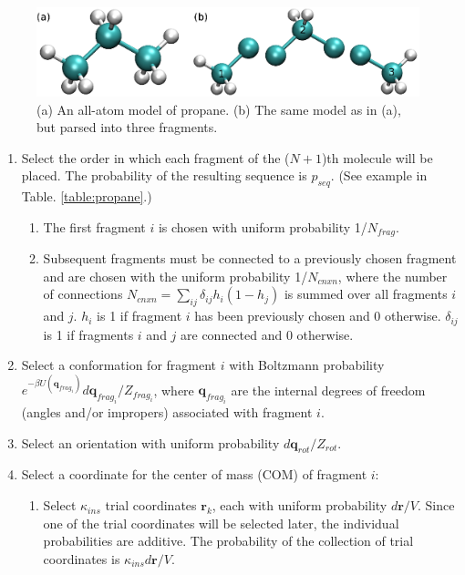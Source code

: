 \begin{figure}[h]
	\centering
	\includegraphics[width=0.99\textwidth]{c3}
	\caption{(a) An all-atom model of propane. (b) The same model as in (a), but parsed into three fragments.}
	\label{fig:propaneFragments}
\end{figure}


\begin{enumerate}
  \item Select the order in which each fragment of the ($N+1$)th molecule will be placed. The probability of the resulting sequence is $p_{seq}$. (See example in Table. \ref{table:propane}.)
  \begin{enumerate}
		\item The first fragment $i$ is chosen with uniform probability 1/$N_{frag}$.
    \item Subsequent fragments must be connected to a previously chosen fragment and are chosen with the uniform probability 1/$N_{cnxn}$, where the number of connections $N_{cnxn}= \sum_{ij}{\delta_{ij} h_{i} (1-h_{j})}$ is summed over all fragments $i$ and $j$. $h_i$ is 1 if fragment $i$ has been previously chosen and 0 otherwise. $\delta_{ij}$ is 1 if fragments $i$ and $j$ are connected and 0 otherwise.
  \end{enumerate}
	\item Select a conformation for fragment $i$ with Boltzmann probability \newline $e^{-\beta U(\mathbf{q}_{frag_i})}d\mathbf{q}_{frag_i}/Z_{frag_i}$, where $\mathbf{q}_{frag_i}$ are the internal degrees of freedom (angles and/or impropers) associated with fragment $i$.
	\item Select an orientation with uniform probability $d\mathbf{q}_{rot}/Z_{rot}$. 
	\item Select a coordinate for the center of mass (COM) of fragment $i$:
	\begin{enumerate}
		\item Select $\kappa_{ins}$ trial coordinates $\mathbf{r}_k$, each with uniform probability $d\mathbf{r}/V$. Since one of the trial coordinates will be selected later, the individual probabilities are additive. The probability of the collection of trial coordinates is $\kappa_{ins}d\mathbf{r}/V$.

\end{enumerate}
\end{enumerate}
